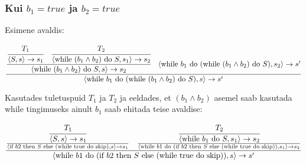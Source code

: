 \subsubsection{Kui \(b_1 = true\) ja \(b_2 = true\)}

Esimene avaldis:

\[
  \frac{
    \cfrac{
      \cfrac{
        T_1
      }{
        \langle
        S, s
        \rangle \rightarrow s_1
      }
      \quad
      \cfrac{
        T_2
      }{
        \langle
        \text{while } (b_1 \wedge b_2) \text{ do } S, s_1
        \rangle \rightarrow s_2
      }
    }{
      \langle
      \text{while } (b_1 \wedge b_2) \text{ do } S, s
      \rangle \rightarrow s_2
    }
    \quad
    \langle
    \text{while } b_1 \text{ do } (\text{while } (b_1 \wedge b_2) \text{ do } S), s_2
    \rangle \rightarrow s'
  }{
    \langle
    \text{while } b_1 \text{ do } (\text{while } (b_1 \wedge b_2) \text{ do } S), s
    \rangle \rightarrow s'
  }
\] 

Kasutades tuletuspuid \(T_1\) ja \(T_2\) ja eeldades, et \((b_1 \wedge b_2)\)
asemel saab kasutada while tingimuseks ainult \(b_1\) saab ehitada teise avaldise:

\[
\frac{
  \frac{
    \cfrac{
      T_1
    }{
      \langle
      S, s
      \rangle \rightarrow s_1
    }
  }{
    \langle
    \text{if } b2 \text{ then } S \text{ else }
    (\text{while true do skip})
    ,s
    \rangle \rightarrow s_1
  }
  \quad
  \frac{
    \cfrac{
      T_2
    }{
      \langle
      \text{while } b_1 \text{ do } S, s_1
      \rangle \rightarrow s_2
    }
  }{
    \langle
    \text{while } b1 \text{ do } (\text{if } b2 \text{ then } S \text{ else }
    (\text{while true do skip}))
    ,s_1
    \rangle \rightarrow s_2
  }
}{
  \langle
  \text{while } b1 \text{ do } (\text{if } b2 \text{ then } S \text{ else }
  (\text{while true do skip}))
  ,s
  \rangle \rightarrow s'
}
\]
